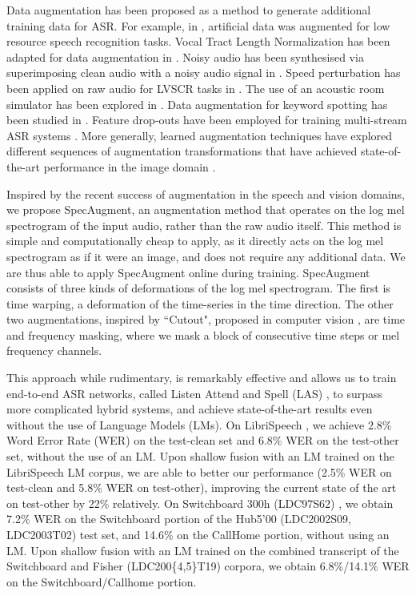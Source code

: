 Data augmentation has been proposed as a method to generate additional training data for ASR. For example, in \cite{kanda-asru-2013,ragni-interspeech-2014}, artificial data was augmented for low resource speech recognition tasks. Vocal Tract Length Normalization has been adapted for data augmentation in \cite{jaitly-2013-icml}. Noisy audio has been synthesised via superimposing clean audio with a noisy audio signal in \cite{hannun-arxiv-2014}. Speed perturbation has been applied on raw audio for LVSCR tasks in \cite{ko-interspeech-2015}. The use of an acoustic room simulator has been explored in \cite{kim-interspeech-2017}. Data augmentation for keyword spotting has been studied in \cite{prabhavalkar-2015-icassp, raju-arxiv-2018}. Feature drop-outs have been employed for training multi-stream ASR systems \cite{mallidi-icassp-2016}. More generally, learned augmentation techniques have explored different sequences of augmentation transformations that have achieved state-of-the-art performance in the image domain \cite{Cubuk2018AutoAugmentLA}.

Inspired by the recent success of augmentation in the speech and vision domains, we propose SpecAugment, an augmentation method that operates on the log mel spectrogram of the input audio, rather than the raw audio itself. This method is simple and computationally cheap to apply, as it directly acts on the log mel spectrogram as if it were an image, and does not require any additional data. We are thus able to apply SpecAugment online during training. SpecAugment consists of three kinds of deformations of the log mel spectrogram. The first is time warping, a deformation of the time-series in the time direction. The other two augmentations, inspired by ``Cutout", proposed in computer vision \cite{devries-arxiv-2017}, are time and frequency masking, where we mask a block of consecutive time steps or mel frequency channels.

This approach while rudimentary, is remarkably effective and allows us to train end-to-end ASR networks, called Listen Attend and Spell (LAS) \cite{Chan2016ListenAA}, to surpass more complicated hybrid systems, and achieve state-of-the-art results even without the use of Language Models (LMs). 
On LibriSpeech \cite{Panayotov2015LibriSpeechAA}, we achieve 2.8\% Word Error Rate (WER) on the test-clean set and 6.8\% WER on the test-other set, without the use of an LM. Upon shallow fusion \cite{gulcehre-2015-arxiv} with an LM trained on the LibriSpeech LM corpus, we are able to better our performance (2.5\% WER on test-clean and 5.8\% WER on test-other), improving the current state of the art on test-other by 22\% relatively. On Switchboard 300h (LDC97S62) \cite{switchboard}, we obtain 7.2\% WER on the Switchboard portion of the Hub5'00 (LDC2002S09, LDC2003T02) test set, and 14.6\% on the CallHome portion, without using an LM. Upon shallow fusion with an LM trained on the combined transcript of the Switchboard and Fisher (LDC200\{4,5\}T19) \cite{fisher} corpora, we obtain 6.8\%/14.1\% WER on the Switchboard/Callhome portion.

